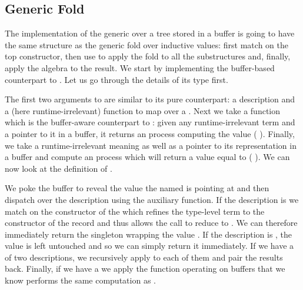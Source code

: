 
\subsection{Generic Fold}\label{sec:bufferfold}

The implementation of the generic  over a tree stored
in a buffer is going to have the same structure as the generic fold over
inductive values: first match on the top constructor, then use 
to apply the fold to all the substructures and, finally, apply the algebra to
the result.
%
We start by implementing the buffer-based counterpart to .
Let us go through the details of its type first.


The first two arguments to  are similar to its pure
counterpart:
a description 
and a (here runtime-irrelevant) function 
to map over a .
%
Next we take a function which is the buffer-aware counterpart to :
given any runtime-irrelevant term  and a pointer to it in a buffer,
it returns an  process computing the value ( ).
%
Finally, we take a runtime-irrelevant meaning 
as well as a pointer to its representation in a buffer and compute
an  process which will return a value equal to
(   ).
%
We can now look at the definition of .


We poke the buffer to reveal the value the 
named  is pointing at and then dispatch over the description
 using the  auxiliary function.
%
If the description is  we match on the constructor
 of the  which refines the type-level
term  to the constructor  of the record
 and thus allows the  call to
reduce to . We can therefore immediately return the
singleton wrapping the value .
%
If the description is , the value is left untouched
and so we can simply return it immediately.
%
If we have a  of two descriptions, we recursively apply
 to each of them and pair the results back.
%
Finally, if we have a  we apply the function operating
on buffers that we know performs the same computation as .


